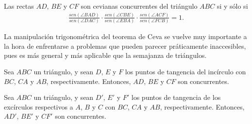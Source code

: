 \begin{section-theorem.tcb}
    Las rectas $AD$, $BE$ y $CF$ son cevianas concurrentes del triángulo $ABC$ si y sólo si
    \begin{gather*}
        \frac{sen(\angle BAD)}{sen(\angle DAC)} \cdot \frac{sen(\angle CBE)}{sen(\angle EBA)} \cdot \frac{sen(\angle ACF)}{sen(\angle FCB)} = 1.
    \end{gather*}
\end{section-theorem.tcb}

La manipulación trigonométrica del teorema de Ceva se vuelve muy importante a la hora de enfrentarse a problemas que pueden parecer práticamente inaccesibles, pues es más general y más aplicable que la semajanza de triángulos.

\begin{section-definition}
    Sea $ABC$ un triángulo, y sean $D$, $E$ y $F$ los puntos de tangencia del incírculo con $BC$, $CA$ y $AB$, respectivamente.
    Entonces, $AD$, $BE$ y $CF$ son concurrentes.
\end{section-definition}

\begin{section-definition}
    Sea $ABC$ un triángulo, y sean $D'$, $E'$ y $F'$ los puntos de tangencia de los excírculos respectivos a $A$, $B$ y $C$ con $BC$, $CA$ y $AB$, respectivamente.
    Entonces, $AD'$, $BE'$ y $CF'$ son concurrentes.
\end{section-definition}


